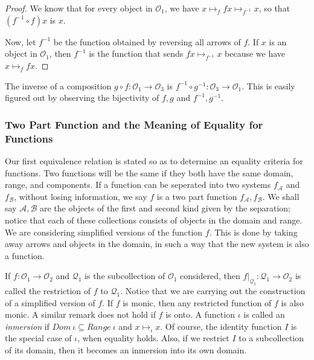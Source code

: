 \documentclass [12pt]{book}
\begin{document}
\begin{proof}We know that for every object in $\mathcal O_1$, we have $x\mapsto_f fx\mapsto_{f^{-1}}x$, so that $(f^{-1}\circ f)x$ is $x$.

Now, let $f^{-1}$ be the function obtained by reversing all arrows of $f$. If $x$ is an object in $\mathcal O_1$, then $f^{-1}$ is the function that sends $fx\mapsto_{f^{-1}}x$ because we have $x\mapsto_f fx$.\end{proof}

The inverse of a composition $g\circ f:\mathcal O_{1}\rightarrow\mathcal O_3$ is $f^{-1}\circ g^{-1}:\mathcal O_3\rightarrow\mathcal O_1$. This is easily figured out by observing the bijectivity of $f,g$ and $f^{-1},g^{-1}$.

\subsubsection{Two Part Function and the Meaning of Equality for Functions} 

Our first equivalence relation is stated so as to determine an equality criteria for functions. Two functions will be the same if they both have the same domain, range, and components. If a function can be seperated into two systems $f_{\mathcal{A}}$ and $f_\mathcal{B}$, without losing information, we say $f$ is a two part function $f_{\mathcal{A}},f_{\mathcal{B}}$. We shall say $\mathcal{A},\mathcal{B}$ are the objects of the first and second kind given by the separation; notice that each of these collections consists of objects in the domain and range. We are considering simplified versions of the function $f$. This is done by taking away arrows and objects in the domain, in such a way that the new system is also a function. 

If $f:\mathcal{O}_{1}\rightarrow\mathcal{O}_2$ and $\mathcal{Q}_{1}$ is the subcollection of $\mathcal{O}_1$ considered, then $f|_{\mathcal{Q}_1}:\mathcal{Q}_{1}\rightarrow\mathcal{O}_2$ is called the restriction of $f$ to $\mathcal{Q}_1$. Notice that we are carrying out the construction of a simplified version of $f$. If $f$ is monic, then any restricted function of $f$ is also monic.  A similar remark does not hold if $f$ is onto. A function $\iota$ is called an \textit{inmersion} if $Dom~\iota\subseteq Range~\iota$ and $x\mapsto_{\iota}x$. Of course, the identity function $I$ is the special case of $\iota$, when equality holds. Also, if we restrict $I$ to a subcollection of its domain, then it becomes an inmersion into its own domain.
\end{document}
